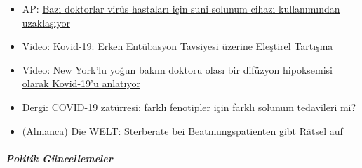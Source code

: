 \begin{itemize}
\tightlist
\item
  AP: \href{https://apnews.com/8ccd325c2be9bf454c2128dcb7bd616d}{Bazı
  doktorlar virüs hastaları için suni solunum cihazı kullanımından
  uzaklaşıyor}
\item
  Video: \href{https://www.youtube.com/watch?v=QPlEUAVjxV8}{Kovid-19:
  Erken Entübasyon Tavsiyesi üzerine Eleştirel Tartışma}
\item
  Video: \href{https://www.youtube.com/watch?v=NmRlvX3VrAQ}{New York'lu
  yoğun bakım doktoru olası bir difüzyon hipoksemisi olarak Kovid-19'u
  anlatıyor}
\item
  Dergi:
  \href{https://link.springer.com/article/10.1007/s00134-020-06033-2}{COVID-19
  zatürresi: farklı fenotipler için farklı solunum tedavileri mi?}
\item
  (Almanca) Die WELT:
  \href{https://www.welt.de/vermischtes/article207221877/Corona-Pandemie-Sterberate-bei-Beatmungspatienten-gibt-Raetsel-auf.html}{Sterberate
  bei Beatmungspatienten gibt Rätsel auf}
\end{itemize}

\hypertarget{politik-guxfcncellemeler-2}{%
\subparagraph{\texorpdfstring{\textbf{Politik
Güncellemeler}}{Politik Güncellemeler}}\label{politik-guxfcncellemeler-2}}

